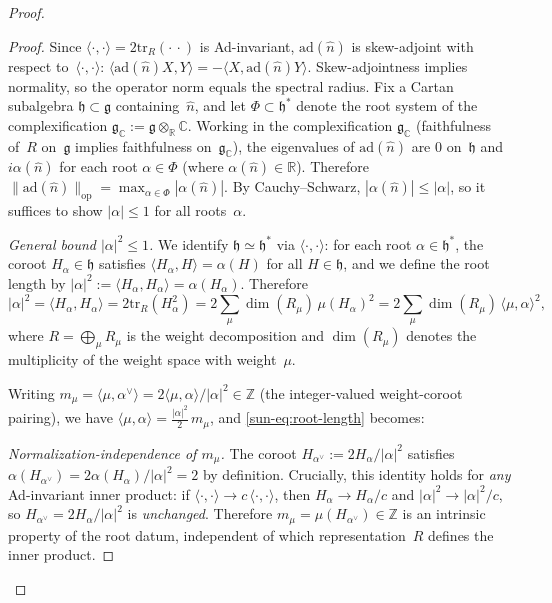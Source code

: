 \documentclass[11pt]{article}
\theoremstyle{definition}
\newcommand{\tr}{\mathrm{tr}}
\newcommand{\R}{\mathbb{R}}
\newcommand{\Z}{\mathbb{Z}}
\newcommand{\ad}{\mathrm{ad}}
\newcommand{\fg}{\mathfrak{g}}
\begin{document}
\begin{proof}
\begin{proof}
Since $\langle\cdot,\cdot\rangle=2\tr_R(\cdot\,\cdot)$
is Ad-invariant, $\ad(\hat{n})$ is skew-adjoint with
respect to~$\langle\cdot,\cdot\rangle$:
$\langle\ad(\hat{n})X,Y\rangle
=-\langle X,\ad(\hat{n})Y\rangle$.
Skew-adjointness implies normality, so the operator norm
equals the spectral radius.  Fix a Cartan
subalgebra $\mathfrak{h}\subset\fg$ containing~$\hat{n}$,
and let $\Phi\subset\mathfrak{h}^*$ denote the root
system of the complexification
$\fg_{\mathbb{C}}:=\fg\otimes_\R\mathbb{C}$.
Working in the
complexification $\fg_{\mathbb{C}}$ (faithfulness of~$R$ on~$\fg$
implies faithfulness on~$\fg_{\mathbb{C}}$), the eigenvalues
of $\ad(\hat{n})$ are $0$ on~$\mathfrak{h}$ and
$i\alpha(\hat{n})$ for each root
$\alpha\in\Phi$ (where $\alpha(\hat{n})\in\R$).
Therefore
$\|\ad(\hat{n})\|_{\mathrm{op}}
=\max_{\alpha\in\Phi}|\alpha(\hat{n})|$.
By Cauchy--Schwarz, $|\alpha(\hat{n})|\le|\alpha|$,
so it suffices to show $|\alpha|\le 1$ for all
roots~$\alpha$.

\emph{General bound $|\alpha|^2\le 1$.}
We identify $\mathfrak{h}\simeq\mathfrak{h}^*$ via
$\langle\cdot,\cdot\rangle$: for each root
$\alpha\in\mathfrak{h}^*$, the coroot
$H_\alpha\in\mathfrak{h}$ satisfies
$\langle H_\alpha,H\rangle=\alpha(H)$ for all
$H\in\mathfrak{h}$, and we define the root length by
$|\alpha|^2:=\langle H_\alpha,H_\alpha\rangle
=\alpha(H_\alpha)$.  Therefore
\begin{equation}\label{sun-eq:root-length}
|\alpha|^2=\langle H_\alpha,H_\alpha\rangle
=2\tr_R(H_\alpha^2)
=2\sum_\mu\dim(R_\mu)\,\mu(H_\alpha)^2
=2\sum_\mu\dim(R_\mu)\,\langle\mu,\alpha\rangle^2,
\end{equation}
where $R=\bigoplus_\mu R_\mu$ is the weight
decomposition and $\dim(R_\mu)$ denotes the multiplicity
of the weight space with weight~$\mu$.

Writing $m_\mu=\langle\mu,\alpha^\vee\rangle
=2\langle\mu,\alpha\rangle/|\alpha|^2\in\Z$
(the integer-valued weight-coroot pairing),
we have $\langle\mu,\alpha\rangle
=\tfrac{|\alpha|^2}{2}\,m_\mu$, and
\eqref{sun-eq:root-length} becomes:

\emph{Normalization-independence of $m_\mu$.}
The coroot $H_{\alpha^\vee}:=2H_\alpha/|\alpha|^2$
satisfies $\alpha(H_{\alpha^\vee})
=2\alpha(H_\alpha)/|\alpha|^2=2$ by definition.
Crucially, this identity holds for \emph{any}
Ad-invariant inner product: if
$\langle\cdot,\cdot\rangle\to c\,
\langle\cdot,\cdot\rangle$, then
$H_\alpha\to H_\alpha/c$ and
$|\alpha|^2\to|\alpha|^2/c$, so
$H_{\alpha^\vee}=2H_\alpha/|\alpha|^2$ is
\emph{unchanged}.  Therefore
$m_\mu=\mu(H_{\alpha^\vee})\in\Z$ is an intrinsic
property of the root datum, independent of which
representation~$R$ defines the inner product.


\end{proof}
\end{proof}
\end{document}
